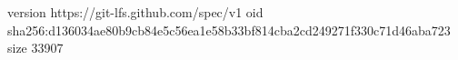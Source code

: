 version https://git-lfs.github.com/spec/v1
oid sha256:d136034ae80b9cb84e5c56ea1e58b33bf814cba2cd249271f330c71d46aba723
size 33907
